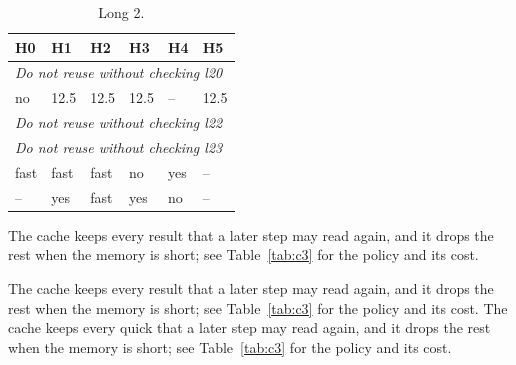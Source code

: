 \begin{longtable}{llllll}
\caption{Long 2.}\label{tab:c2}\\
\toprule
    \textbf{H0} & \textbf{H1} & \textbf{H2} & \textbf{H3} & \textbf{H4} & \textbf{H5} \\
    \midrule
    \multicolumn{6}{l}{\emph{Do not reuse without checking l20}} \\
    no & 12.5 & 12.5 & 12.5 & -- & 12.5 \\
    \multicolumn{6}{l}{\emph{Do not reuse without checking l22}} \\
    \multicolumn{6}{l}{\emph{Do not reuse without checking l23}} \\
    fast & fast & fast & no & yes & -- \\
    -- & yes & fast & yes & no & -- \\
    \bottomrule
\end{longtable}

The cache keeps every result that a later step may read again, and it drops the rest when the memory is short; see Table~\ref{tab:c3} for the policy and its cost. 

\begin{table}[t]
  \centering
  \caption{Below 3.}
\end{table}

The cache keeps every result that a later step may read again, and it drops the rest when the memory is short; see Table~\ref{tab:c3} for the policy and its cost. The cache keeps every quick that a later step may read again, and it drops the rest when the memory is short; see Table~\ref{tab:c3} for the policy and its cost. 
